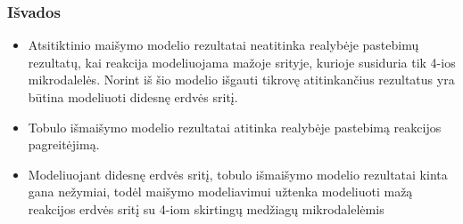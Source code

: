 \documentclass{beamer}
\begin{document}
\begin{frame}
\frametitle{Išvados}
\begin{itemize}
    \item Atsitiktinio maišymo modelio rezultatai neatitinka realybėje pastebimų rezultatų, kai reakcija modeliuojama mažoje srityje, kurioje susiduria tik 4-ios mikrodalelės. Norint iš šio modelio išgauti tikrovę atitinkančius rezultatus yra būtina modeliuoti didesnę erdvės sritį.

    \item Tobulo išmaišymo modelio rezultatai atitinka realybėje pastebimą reakcijos pagreitėjimą.
    
    \item Modeliuojant didesnę erdvės sritį, tobulo išmaišymo modelio rezultatai kinta gana nežymiai, todėl maišymo modeliavimui užtenka modeliuoti mažą reakcijos erdvės sritį su 4-iom skirtingų medžiagų mikrodalelėmis

\end{itemize}
\end{frame}

\end{document}
